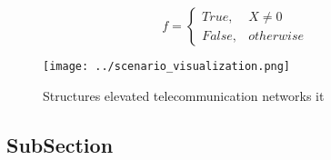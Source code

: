 \documentclass[a4paper]{article}
\begin{document}
\begin{equation}   f =
\begin{cases} True, & X \neq 0\\
False, & otherwise
\end{cases}
\end{equation}

\begin{figure}
\centering
\texttt{[image: ../scenario\_visualization.png]}
\caption{Structures elevated telecommunication networks it
}
\end{figure}
 
\subsection{SubSection}
\end{document}
